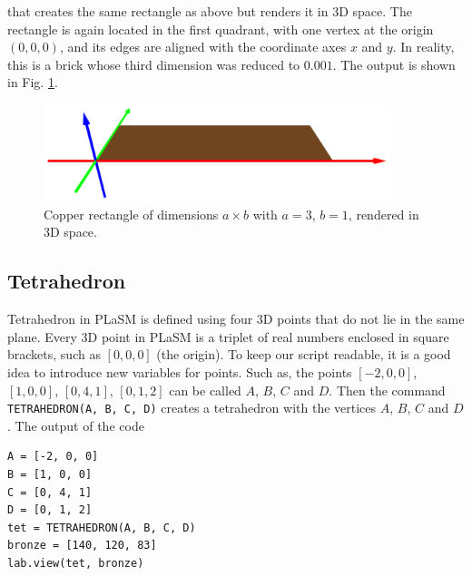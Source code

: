 \noindent
that creates the same rectangle as above but renders it in 3D space.
The rectangle is again located in the first quadrant, with one vertex 
at the origin $(0, 0, 0)$, and its edges are aligned with the coordinate
axes $x$ and $y$. In reality, this is a brick whose third dimension was
reduced to $0.001$. The output is shown in Fig. \ref{fig:rect-111}.

\begin{figure}[!ht]
\begin{center}
\includegraphics[width=0.9\textwidth]{img/rect-111.png}
\end{center}
\vspace{-4mm}
\caption{Copper rectangle of dimensions $a \times b$ with $a = 3$, $b = 1$, rendered in 3D space.}
\label{fig:rect-111}
\end{figure}
\noindent




\subsection{Tetrahedron}

Tetrahedron in PLaSM is defined using four 3D points that do not lie in the same 
plane. Every 3D point in PLaSM is a triplet of real numbers enclosed in square brackets, such as $[0, 0, 0]$ (the 
origin). To keep our script readable, it is a good idea to introduce new variables
for points. Such as, the points $[-2, 0, 0]$, $[1, 0, 0]$, $[0, 4, 1]$, $[0, 1, 2]$
can be called $A$, $B$, $C$ and $D$. 
Then the command {\tt TETRAHEDRON(A, B, C, D)} creates a tetrahedron with the vertices 
$A$, $B$, $C$ and $D$. The output of the code\\

\begin{bbox}
\begin{verbatim}
A = [-2, 0, 0] 
B = [1, 0, 0] 
C = [0, 4, 1] 
D = [0, 1, 2]
tet = TETRAHEDRON(A, B, C, D)
bronze = [140, 120, 83]
lab.view(tet, bronze)
\end{verbatim}
\end{bbox}
\vspace{6mm}

